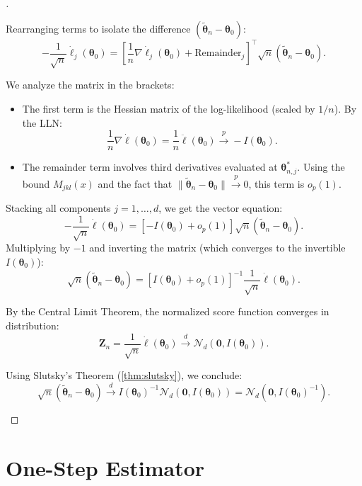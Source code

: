 \begin{proof}[]
\begin{enumerate}
    Rearranging terms to isolate the difference $(\tilde{\boldsymbol{\theta}}_n - \boldsymbol{\theta}_0)$:
    \[
    -\frac{1}{\sqrt{n}} \dot{\ell}_j(\boldsymbol{\theta}_0) = \left[ \frac{1}{n} \nabla \dot{\ell}_j(\boldsymbol{\theta}_0) + \text{Remainder}_j \right]^\top \sqrt{n}(\tilde{\boldsymbol{\theta}}_n - \boldsymbol{\theta}_0).
    \]
    
    We analyze the matrix in the brackets:
    \begin{itemize}
        \item The first term is the Hessian matrix of the log-likelihood (scaled by $1/n$). By the LLN:
        \[ \frac{1}{n} \nabla \dot{\ell}(\boldsymbol{\theta}_0) = \frac{1}{n} \ddot{\ell}(\boldsymbol{\theta}_0) \stackrel{p}{\longrightarrow} -I(\boldsymbol{\theta}_0). \]
        \item The remainder term involves third derivatives evaluated at $\boldsymbol{\theta}_{n,j}^*$. Using the bound $M_{jkl}(x)$ and the fact that $\|\tilde{\boldsymbol{\theta}}_n - \boldsymbol{\theta}_0\| \stackrel{p}{\longrightarrow} 0$, this term is $o_p(1)$.
    \end{itemize}

    Stacking all components $j=1,\dots,d$, we get the vector equation:
    \[
    -\frac{1}{\sqrt{n}} \dot{\ell}(\boldsymbol{\theta}_0) = \left[ -I(\boldsymbol{\theta}_0) + o_p(1) \right] \sqrt{n}(\tilde{\boldsymbol{\theta}}_n - \boldsymbol{\theta}_0).
    \]
    Multiplying by $-1$ and inverting the matrix (which converges to the invertible $I(\boldsymbol{\theta}_0)$):
    \[
    \sqrt{n}(\tilde{\boldsymbol{\theta}}_n - \boldsymbol{\theta}_0) = \left[ I(\boldsymbol{\theta}_0) + o_p(1) \right]^{-1} \frac{1}{\sqrt{n}} \dot{\ell}(\boldsymbol{\theta}_0).
    \]
    
    By the Central Limit Theorem, the normalized score function converges in distribution:
    \[ \mathbf{Z}_n = \frac{1}{\sqrt{n}} \dot{\ell}(\boldsymbol{\theta}_0) \xrightarrow{d} \mathcal{N}_d(\mathbf{0}, I(\boldsymbol{\theta}_0)). \]
    
    Using Slutsky's Theorem (\autoref{thm:slutsky}), we conclude:
    \[
    \sqrt{n}(\tilde{\boldsymbol{\theta}}_n - \boldsymbol{\theta}_0) \xrightarrow{d} I(\boldsymbol{\theta}_0)^{-1} \mathcal{N}_d(\mathbf{0}, I(\boldsymbol{\theta}_0)) = \mathcal{N}_d(\mathbf{0}, I(\boldsymbol{\theta}_0)^{-1}).
    \]
\end{enumerate}
\end{proof}

\section{One-Step Estimator}
\label{sec:One-Step Estimator}

